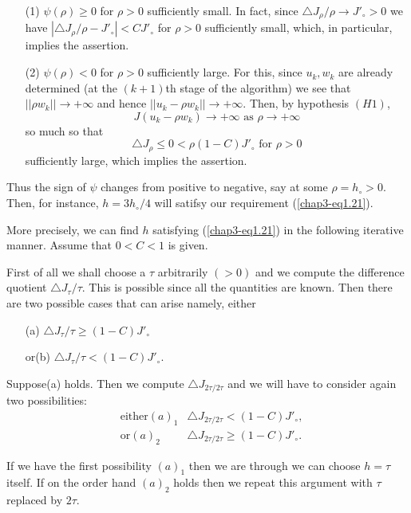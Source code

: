 \begin{enumerate}
\item[(1)] $\psi (\rho) \geq 0$ for $\rho > 0$ sufficiently small. In fact, since $\triangle J_{\rho} / \rho \to {J'}_{\circ} > 0$ we have $|\triangle J_{\rho} / \rho - {J'}_{\circ}| < C {J'}_{\circ}$ for $\rho > 0$ sufficiently small, which, in particular, implies the assertion.

\item[(2)] $\psi (\rho) < 0$ for $\rho > 0$ sufficiently large. For this, since $u_{k}, w_{k}$ are already determined (at the $(k+1)$th stage of the algorithm) we see that $||\rho w_k|| \to + \infty$ and hence $||u_{k} - \rho w_{k}|| \to + \infty$. Then, by hypothesis $(H1)$,
$$
J(u_{k} - \rho w_{k}) \to + \infty \text{ as } \rho \to + \infty
$$
so much so that
$$
\triangle J_{\rho} \leq 0 < \rho(1-C) {J'}_{\circ} \text{ for } \rho > 0
$$
sufficiently large, which implies the assertion.
\end{enumerate}

Thus the sign of $\psi$ changes from positive to negative, say at some $\rho = h_{\circ} > 0$. Then, for instance, $h = 3h_{\circ}/4$ will satifsy our requirement (\ref{chap3-eq1.21}).

More precisely, we can find $h$ satisfying (\ref{chap3-eq1.21}) in the following iterative manner. Assume that $0 < C < 1$ is given.

First of all we shall choose a $\tau$ arbitrarily $(> 0)$ and we compute the difference quotient $\triangle J_{\tau}/ \tau$. This is possible since all the quantities are known. Then there are two possible cases that can arise namely, either 
\begin{enumerate}
\item[(a)] \qquad\qquad $\triangle J_{\tau}/\tau \geq (1-C) {J'}_{\circ}$
\item[or(b)] \qquad\qquad $\triangle J_{\tau}/\tau < (1-C) {J'}_{\circ}$.
\end{enumerate}

Suppose\pageoriginale (a) holds. Then we compute $\triangle J_{2\tau /2\tau}$ and we will have to consider again two possibilities:
\begin{align*}
& \text{either} (a)_{1}   & \triangle J_{2\tau/ 2\tau} < (1-C){J'}_{\circ},\\
& \text{or} (a)_{2}  & \triangle J_{2\tau / 2\tau} \geq (1-C){J'}_{\circ}.
\end{align*}

If we have the first possibility $(a)_{1}$ then we are through we can choose $h = \tau$ itself. If on the order hand $(a)_{2}$ holds then we repeat this argument with $\tau$ replaced by $2\tau$.


